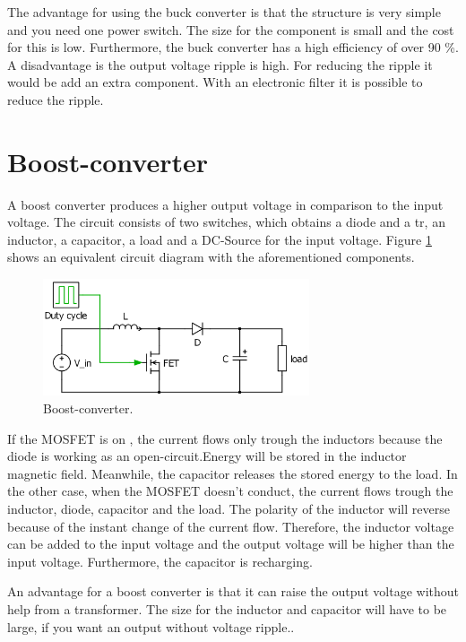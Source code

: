 The advantage for using the buck converter is that the structure is very simple and you need one power switch. The size for the component is small and the cost for this is low. Furthermore, the buck converter has a high efficiency of over 90 \%\cite{datasheetbuck}. A disadvantage  is the output voltage ripple is high. For reducing the ripple it would be add an extra component. With an electronic filter it is possible to reduce the ripple\cite{advantagebuck}.

\section{Boost-converter\label{Boost-C}}

A boost converter produces a higher output voltage in comparison to the input voltage. The circuit consists of two switches, which obtains a diode and a tr, an inductor, a capacitor, a load and a DC-Source for the input voltage. Figure \ref{Boost-converter} shows an equivalent circuit diagram with the aforementioned components. %

\begin{figure}[htbp]
	\begin{center}
		\includegraphics[width=0.7\textwidth]{../Pictures/Boost-converter}
		\caption{Boost-converter.}
		\label{Boost-converter}
	\end{center}	
\end{figure}

If the MOSFET is on , the current flows only trough the inductors because the diode  is working as an open-circuit.Energy will be stored in the inductor magnetic field. Meanwhile, the capacitor releases the stored energy to the load.%
In the other case, when the MOSFET doesn’t conduct, the current flows trough the inductor, diode, capacitor and the load. The polarity of the inductor will reverse because of the instant change of the current flow.%
Therefore, the inductor voltage can be added to the input voltage and the output voltage will be higher than the input voltage. Furthermore, the capacitor is recharging\cite{circuitboost}.

An advantage for a boost converter is that it can raise the output voltage without help from a transformer. The size for the inductor and capacitor will have to be large, if you want an output without voltage ripple.\cite{advantageboost}. %
 
